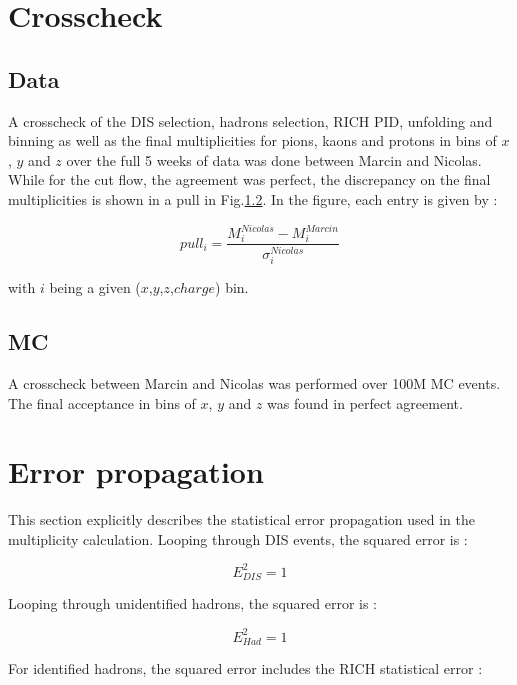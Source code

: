 \documentclass[letterpaper,12pt]{article}
\begin{document}
\appendix

\section{Crosscheck} \label{XC}

\subsection{Data}

A crosscheck of the DIS selection, hadrons selection, RICH PID, unfolding and binning as well as the final multiplicities for pions, kaons and protons in bins of $x$, $y$ and $z$ over the full 5 weeks of data was done between Marcin and Nicolas. While for the cut flow, the agreement was perfect, the discrepancy on the final multiplicities is shown in a pull in Fig.\ref{}. In the figure, each entry is given by :

\begin{equation}
	pull_i = \frac{M_i^{Nicolas}-M_i^{Marcin}}{\sigma_i^{Nicolas}}
\end{equation}

with $i$ being a given ($x$,$y$,$z$,$charge$) bin.

\subsection{MC}

A crosscheck between Marcin and Nicolas was performed over 100M MC events. The final acceptance in bins of $x$, $y$ and $z$ was found in perfect agreement.

\section{Error propagation} \label{Eprop}

This section explicitly describes the statistical error propagation used in the multiplicity calculation. Looping through DIS events, the squared error is :

\begin{equation}
		E^2_{DIS} = 1
\end{equation}

Looping through unidentified hadrons, the squared error is :

\begin{equation}
		E^2_{Had} = 1
\end{equation}

For identified hadrons, the squared error includes the RICH statistical error :
\end{document}
